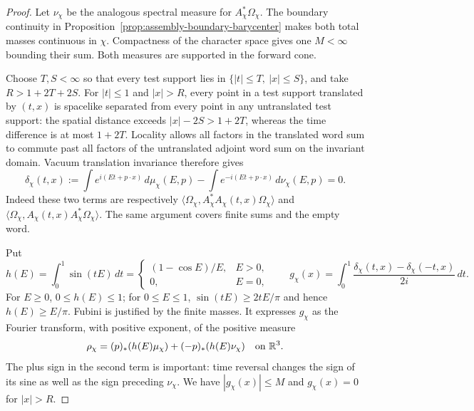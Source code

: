 \begin{proof}
Let $\nu_\chi$ be the analogous spectral measure for
$A_\chi^*\Omega_\chi$. The boundary continuity in Proposition~\ref{prop:assembly-boundary-barycenter} makes both total masses
continuous in $\chi$. Compactness of the character space gives one
$M<\infty$ bounding their sum. Both measures are supported in the
forward cone.

Choose $T,S<\infty$ so that every test support lies in
$\{|t|\le T,\ |x|\le S\}$, and take $R>1+2T+2S$.
For $|t|\le1$ and $|x|>R$, every point in a test support translated
by $(t,x)$ is spacelike separated from every point in any untranslated
test support: the spatial distance exceeds $|x|-2S>1+2T$, whereas
the time difference is at most $1+2T$. Locality allows all factors
in the translated word sum to commute past all factors of the
untranslated adjoint word sum on the invariant domain. Vacuum
translation invariance therefore gives
\[
 \delta_\chi(t,x):=
 \int e^{i(Et+p\cdot x)}\,d\mu_\chi(E,p)
 -\int e^{-i(Et+p\cdot x)}\,d\nu_\chi(E,p)=0.
\]
Indeed these two terms are respectively
$\langle\Omega_\chi,A_\chi^*A_\chi(t,x)\Omega_\chi\rangle$
and
$\langle\Omega_\chi,A_\chi(t,x)A_\chi^*\Omega_\chi\rangle$.
The same argument covers finite sums and the empty word.

Put
\[
 h(E)=\int_0^1\sin(tE)\,dt
 =\begin{cases}(1-\cos E)/E,&E>0,\\0,&E=0,\end{cases}
 \qquad
 g_\chi(x)=\int_0^1
       \frac{\delta_\chi(t,x)-\delta_\chi(-t,x)}{2i}\,dt.
\]
For $E\ge0$, $0\le h(E)\le1$; for $0\le E\le1$,
$\sin(tE)\ge2tE/\pi$ and hence $h(E)\ge E/\pi$.
Fubini is justified by the finite masses. It expresses $g_\chi$ as
the Fourier transform, with positive exponent, of the positive measure
\[
 \rho_\chi=(p)_*(h(E)\mu_\chi)
                    +(-p)_*(h(E)\nu_\chi)
             \quad\hbox{on }\mathbb R^3.
\]
The plus sign in the second term is important: time reversal changes
the sign of its sine as well as the sign preceding $\nu_\chi$.
We have $|g_\chi(x)|\le M$ and $g_\chi(x)=0$ for $|x|>R$.


\end{proof}
